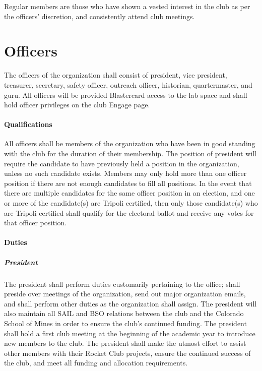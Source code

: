 \documentclass[12pt]{article}
\begin{document}
Regular members are those who have shown a vested interest in the club as per the officers' discretion, 
and consistently attend club meetings. 
\section{Officers}
\label{officers}
The officers of the organization shall consist of president, vice president, treasurer, secretary, safety officer, outreach officer, historian, quartermaster, and guru. All officers will be provided Blastercard access to the lab space and shall hold officer privileges on the club Engage page.

\paragraph{Qualifications}
All officers shall be members of the organization who have been in good standing with the club for the duration of their membership.  The position of president will require the candidate to have previously held a position in the organization, unless no such candidate exists. Members may only hold more than one officer position if there are not enough candidates to fill all positions. In the event that there are multiple candidates for the same officer position in an election, and one or more of the candidate(s) are Tripoli certified, then only those candidate(s) who are Tripoli certified shall qualify for the electoral ballot and receive any votes for that officer position.

\paragraph{Duties}
\subparagraph{President} The president shall perform duties customarily pertaining to the office; 
shall preside over meetings of the organization, 
send out major organization emails, 
and shall perform other duties as the organization shall assign.  
The president will also maintain all SAIL and BSO relations between the club and the Colorado School of Mines in order to ensure the club's continued funding. 
The president shall hold a first club meeting at the beginning of the academic year to introduce new members to the club. 
The president shall make the utmost effort to assist other members with their Rocket Club projects, 
ensure the continued success of the club, and meet all funding and allocation requirements.
\end{document}
